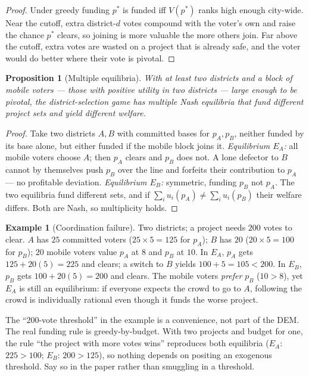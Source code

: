\documentclass[11pt,letterpaper]{article}
\theoremstyle{definition}
\newtheorem{example}{Example}[section]
\theoremstyle{plain}
\newtheorem{proposition}{Proposition}[section]
\theoremstyle{remark}
\begin{document}
\begin{proof}
Under greedy funding $p^*$ is funded iff $V(p^*)$ ranks high enough city-wide. Near the cutoff,
extra district-$d$ votes compound with the voter's own and raise the chance $p^*$ clears, so
joining is more valuable the more others join. Far above the cutoff, extra votes are wasted on a
project that is already safe, and the voter would do better where their vote is pivotal.
\end{proof}

\begin{proposition}[Multiple equilibria]
\label{prop:coord}
With at least two districts and a block of \emph{mobile} voters --- those with positive utility in
two districts --- large enough to be pivotal, the district-selection game has multiple Nash
equilibria that fund different project sets and yield different welfare.
\end{proposition}

\begin{proof}
Take two districts $A,B$ with committed bases for $p_A,p_B$, neither funded by its base alone, but
either funded if the mobile block joins it.
\emph{Equilibrium $E_A$:} all mobile voters choose $A$; then $p_A$ clears and $p_B$ does not. A lone
defector to $B$ cannot by themselves push $p_B$ over the line and forfeits their contribution to
$p_A$ --- no profitable deviation.
\emph{Equilibrium $E_B$:} symmetric, funding $p_B$ not $p_A$.
The two equilibria fund different sets, and if $\sum_i u_i(p_A)\ne\sum_i u_i(p_B)$ their welfare
differs. Both are Nash, so multiplicity holds.
\end{proof}

\begin{example}[Coordination failure]
\label{ex:coord}
Two districts; a project needs $200$ votes to clear. $A$ has $25$ committed voters
($25\times5=125$ for $p_A$); $B$ has $20$ ($20\times5=100$ for $p_B$); $20$ mobile voters value
$p_A$ at $8$ and $p_B$ at $10$. In $E_A$, $p_A$ gets $125+20(5)=225$ and clears; a switch to $B$
yields $100+5=105<200$. In $E_B$, $p_B$ gets $100+20(5)=200$ and clears. The mobile voters
\emph{prefer} $p_B$ ($10>8$), yet $E_A$ is still an equilibrium: if everyone expects the crowd to
go to $A$, following the crowd is individually rational even though it funds the worse project.
\end{example}

\begin{watchout}
The ``$200$-vote threshold'' in the example is a convenience, not part of the DEM. The real funding
rule is greedy-by-budget. With two projects and budget for one, the rule ``the project with more
votes wins'' reproduces both equilibria ($E_A$: $225>100$; $E_B$: $200>125$), so nothing depends on
positing an exogenous threshold. Say so in the paper rather than smuggling in a threshold.
\end{watchout}
\end{document}

